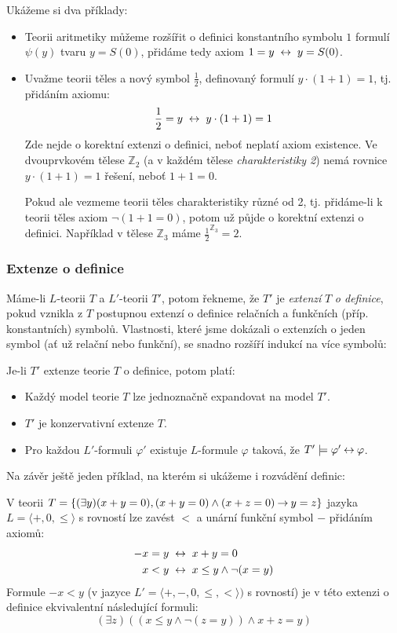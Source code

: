 \begin{example}
    Ukážeme si dva příklady:
    \begin{itemize}
        \item Teorii aritmetiky můžeme rozšířit o definici konstantního symbolu $1$ formulí $\psi(y)$ tvaru $y=S(0)$, přidáme tedy axiom $1=y\ \liff\ y=S(0)$.
        \item Uvažme teorii těles a nový symbol $\frac{1}{2}$, definovaný formulí $y\cdot (1+1)=1$, tj. přidáním axiomu: 
        $$
        \frac{1}{2}=y\ \liff\ y\cdot (1+1)=1
        $$
        Zde nejde o korektní extenzi o definici, neboť neplatí axiom existence. Ve dvouprvkovém tělese $\mathbb Z_2$ (a v každém tělese \emph{charakteristiky 2}) nemá rovnice $y\cdot (1+1)=1$ řešení, neboť $1+1=0$.
        
        
        Pokud ale vezmeme teorii těles charakteristiky různé od 2, tj. přidáme-li k teorii těles axiom $\neg (1+1=0)$, potom už půjde o korektní extenzi o definici. Například v tělese $\mathbb Z_3$ máme $\frac{1}{2}^{\mathbb Z_3}=2$.
    \end{itemize}
\end{example}


\subsubsection*{Extenze o definice}

Máme-li $L$-teorii $T$ a $L'$-teorii $T'$, potom řekneme, že $T'$ je  \emph{extenzí} $T$ \emph{o definice}, pokud vznikla z $T$ postupnou extenzí o definice relačních a funkčních (příp. konstantních) symbolů. Vlastnosti, které jsme dokázali o extenzích o jeden symbol (ať už relační nebo funkční), se snadno rozšíří indukcí na více symbolů:

\begin{corollary}
   Je-li $T'$ extenze teorie $T$ o definice, potom platí:
   \begin{itemize}
    \item Každý model teorie $T$ lze jednoznačně expandovat na model $T'$.
    \item $T'$ je konzervativní extenze $T$.
    \item Pro každou $L'$-formuli $\varphi'$ existuje $L$-formule $\varphi$ taková, že $T'\models\varphi'\mathbin{\leftrightarrow}\varphi$.
   \end{itemize} 
\end{corollary}

Na závěr ještě jeden příklad, na kterém si ukážeme i rozvádění definic:
\begin{example}
    V teorii $T=\{(\exists y)(x+y=0),(x+y=0)\land(x+z=0)\mathbin{\rightarrow} y=z\}$ jazyka $L=\langle +,0,\leq\rangle$ s rovností lze zavést $<$ a unární funkční symbol $-$ přidáním axiomů:
    \begin{align*}
        -x=y\ &\mathbin{\leftrightarrow}\ x+y=0\\
        x<y\ &\mathbin{\leftrightarrow}\ x\leq y\land\neg(x=y)
    \end{align*}
    Formule $-x<y$ (v jazyce $L'=\langle +,-,0,\leq,<\rangle)$ s rovností) je v této extenzi o definice ekvivalentní následující formuli:
    $$
    (\exists z)((x\leq y\land\neg(z=y))\land x+z=y)
    $$
\end{example}


